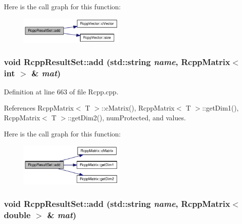 Here is the call graph for this function:\nopagebreak
\begin{figure}[H]
\begin{center}
\leavevmode
\includegraphics[width=146pt]{classRcppResultSet_10a64eb042cd3bac5b635670ae2fff5d_cgraph}
\end{center}
\end{figure}
\hypertarget{classRcppResultSet_56f1bff720a6cf6503ab942bdb6892b3}{
\subsubsection[add]{\setlength{\rightskip}{0pt plus 5cm}void RcppResultSet::add (std::string {\em name}, \/  {\bf RcppMatrix}$<$ int $>$ \& {\em mat})}}
\label{classRcppResultSet_56f1bff720a6cf6503ab942bdb6892b3}




Definition at line 663 of file Rcpp.cpp.

References RcppMatrix$<$ T $>$::cMatrix(), RcppMatrix$<$ T $>$::getDim1(), RcppMatrix$<$ T $>$::getDim2(), numProtected, and values.

Here is the call graph for this function:\nopagebreak
\begin{figure}[H]
\begin{center}
\leavevmode
\includegraphics[width=146pt]{classRcppResultSet_56f1bff720a6cf6503ab942bdb6892b3_cgraph}
\end{center}
\end{figure}
\hypertarget{classRcppResultSet_f6f50ca0a589fc12ef68c0406e83243b}{
\subsubsection[add]{\setlength{\rightskip}{0pt plus 5cm}void RcppResultSet::add (std::string {\em name}, \/  {\bf RcppMatrix}$<$ double $>$ \& {\em mat})}}
\label{classRcppResultSet_f6f50ca0a589fc12ef68c0406e83243b}




